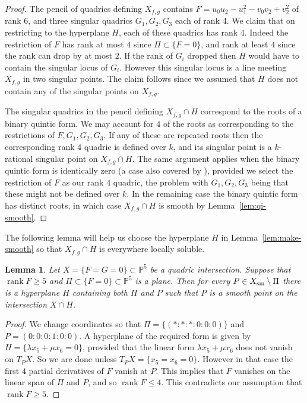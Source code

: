 \documentclass[12pt]{amsart}
\newcommand{\rank}{\operatorname{rank}}
\newcommand{\PP}{{\mathbb P}}
\newtheorem{Lemma}[Proposition]{Lemma}
\theoremstyle{definition}
\begin{document}
\begin{proof}
  The pencil of quadrics defining $X_{f,g}$ contains
  $F = u_0 u_2 - u_1^2 - v_0 v_2 + v_2^2$ of rank 6, and three
  singular quadrics $G_1,G_2,G_3$ each of rank 4. We claim that on
  restricting to the hyperplane $H$, each of these quadrics has rank
  4. Indeed the restriction of $F$ has rank at most $4$ since
  $\Pi \subset \{F = 0\}$, and rank at least $4$ since the rank can
  drop by at most $2$.  If the rank of $G_i$ dropped then $H$ would
  have to contain the singular locus of $G_i$. However this singular
  locus is a line meeting $X_{f,g}$ in two singular points.  The claim
  follows since we assumed that $H$ does not contain any of the
  singular points on $X_{f,g}$.
  
  The singular quadrics in the pencil defining $X_{f,g} \cap H$
  correspond to the roots of a binary quintic form. We may account for
  $4$ of the roots as corresponding to the restrictions of
  $F,G_1,G_2,G_3$. If any of these are repeated roots then the
  corresponding rank $4$ quadric is defined over $k$, and its singular
  point is a $k$-rational singular point on $X_{f,g} \cap H$.  The
  same argument applies when the binary quintic form is identically
  zero (a case also covered by \cite[Lemma 1.14]{CSS}), provided we
  select the restriction of $F$ as our rank $4$ quadric, the problem
  with $G_1,G_2,G_3$ being that these might not be defined over $k$.
  In the remaining case the binary quintic form has distinct roots, in
  which case $X_{f,g} \cap H$ is smooth by Lemma~\ref{lem:qi-smooth}.
\end{proof}

The following lemma will help us choose the hyperplane $H$ in
Lemma~\ref{lem:make-smooth} so that $X_{f,g} \cap H$ is everywhere
locally soluble.

\begin{Lemma}
\label{lem:prepare}
Let $X = \{F = G = 0\} \subset \PP^5$ be a quadric
intersection. Suppose that $\rank F \geqslant 5$ and
$\Pi \subset \{F = 0\} \subset \PP^5$ is a plane. Then for every
$P \in X_{\rm sm} \setminus \Pi$ there is a hyperplane $H$ containing
both $\Pi$ and $P$ such that $P$ is a smooth point on the intersection
$X \cap H$.
\end{Lemma}

\begin{proof}
  We change coordinates so that $\Pi = \{ (*:*:*:0:0:0) \}$ and
  $P = (0:0:0:1:0:0)$. A hyperplane of the required form is given by
  $H = \{\lambda x_5 + \mu x_6 = 0\}$, provided that the linear form
  $\lambda x_5 + \mu x_6$ does not vanish on $T_PX$. So we are done
  unless $T_P X = \{x_5 = x_6 = 0\}$. However in that case the first
  $4$ partial derivatives of $F$ vanish at $P$. This implies that $F$
  vanishes on the linear span of $\Pi$ and $P$, and so
  $\rank F \leqslant 4$. This contradicts our assumption that
  $\rank F \geqslant 5$.
\end{proof}
\end{document}

